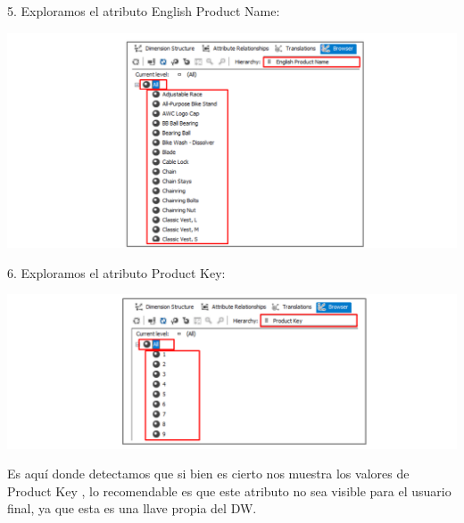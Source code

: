 5. Exploramos el atributo English Product Name:
    \begin{center}
	\includegraphics[width=\columnwidth]{images/task2/img21}
    \end{center}	
 
6. Exploramos el atributo Product Key:

	\begin{center}
	\includegraphics[width=\columnwidth]{images/task2/img22}
    \end{center}	
   
Es aquí donde detectamos que si bien es cierto nos muestra los valores de Product Key , lo recomendable
es que este atributo no sea visible para el usuario final, ya que esta es una llave propia del DW.
	